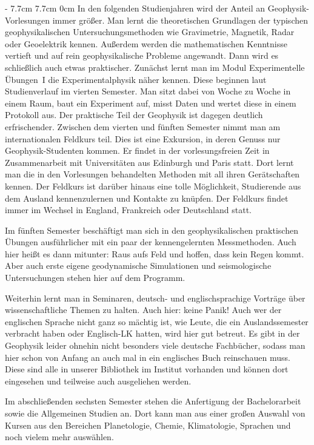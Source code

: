 \begin{multicols}{2}
\dimexpr\columnwidth - 7.7cm 7.7cm
0cm \columnwidth
In den folgenden Studienjahren wird der Anteil an Geophysik-Vorlesungen immer größer. Man lernt die theoretischen Grundlagen der typischen geophysikalischen Untersuchungsmethoden wie Gravimetrie, Magnetik, Radar oder Geoelektrik kennen. Außerdem werden die mathematischen Kenntnisse vertieft und auf rein geophysikalische Probleme angewandt. Dann wird es schließlich auch etwas praktischer. Zunächst lernt man im Modul Experimentelle Übungen~I die Experimentalphysik näher kennen. Diese beginnen laut Studienverlauf im vierten Semester. Man sitzt dabei von Woche zu Woche in einem Raum, baut ein Experiment auf, misst Daten und wertet diese in einem Protokoll aus. Der praktische Teil der Geophysik ist dagegen deutlich erfrischender. Zwischen dem vierten und fünften Semester nimmt man am internationalen Feldkurs teil. Dies ist eine Exkursion, in deren Genuss nur Geophysik-Studenten kommen. Er findet in der vorlesungsfreien Zeit in Zusammenarbeit mit Universitäten aus Edinburgh und Paris statt. Dort lernt man die in den Vorlesungen behandelten Methoden mit all ihren Gerätschaften kennen. Der Feldkurs ist darüber hinaus eine tolle Möglichkeit, Studierende aus dem Ausland kennenzulernen und Kontakte zu knüpfen. Der Feldkurs findet immer im Wechsel in England, Frankreich oder Deutschland statt.

Im fünften Semester beschäftigt man sich in den geophysikalischen praktischen Übungen ausführlicher mit ein paar der kennengelernten Messmethoden. Auch hier heißt es dann mitunter: Raus aufs Feld und hoffen, dass kein Regen kommt. Aber auch erste eigene geodynamische Simulationen und seismologische Untersuchungen stehen hier auf dem Programm.

Weiterhin lernt man in Seminaren, deutsch- und englischsprachige Vorträge über wissenschaftliche Themen zu halten. Auch hier: keine Panik! Auch wer der englischen Sprache nicht ganz so mächtig ist, wie Leute, die ein Auslandssemester verbracht haben oder Englisch-LK hatten, wird hier gut betreut. Es gibt in der Geophysik leider ohnehin nicht besonders viele deutsche Fachbücher, sodass man hier schon von Anfang an auch mal in ein englisches Buch reinschauen muss. Diese sind alle in unserer Bibliothek im Institut vorhanden und können dort eingesehen und teilweise auch ausgeliehen werden.

Im abschließenden sechsten Semester stehen die Anfertigung der Bachelorarbeit sowie die Allgemeinen Studien an. Dort kann man aus einer großen Auswahl von Kursen aus den Bereichen Planetologie, Chemie, Klimatologie, Sprachen und noch vielem mehr auswählen.


\end{multicols}

